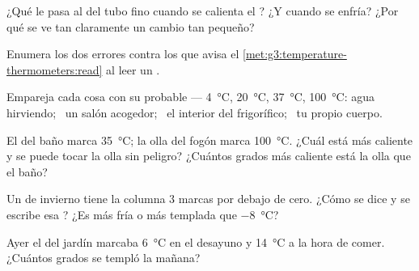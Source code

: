 \begin{exercise}[$\star$]\label{exo:g3:temperature-thermometers:3}
¿Qué le pasa al  del tubo fino cuando se calienta el
? ¿Y cuando se enfría? ¿Por qué se ve tan claramente un
cambio tan pequeño?
\end{exercise}

\begin{exercise}[$\star$]\label{exo:g3:temperature-thermometers:4}
Enumera los dos errores contra los que avisa el
\cref{met:g3:temperature-thermometers:read} al leer un .
\end{exercise}

\begin{exercise}[$\star$]\label{exo:g3:temperature-thermometers:5}
Empareja cada cosa con su  probable ---
\qty{4}{\celsius}, \qty{20}{\celsius}, \qty{37}{\celsius},
\qty{100}{\celsius}: agua hirviendo; \ un salón acogedor; \ el interior
del frigorífico; \ tu propio cuerpo.
\end{exercise}

\begin{exercise}[$\star$]\label{exo:g3:temperature-thermometers:6}
El  del baño marca \qty{35}{\celsius}; la olla del fogón
marca \qty{100}{\celsius}. ¿Cuál está más caliente y se puede tocar la
olla sin peligro? ¿Cuántos grados más caliente está la olla que el
baño?
\end{exercise}

\begin{exercise}[$\star$]\label{exo:g3:temperature-thermometers:7}
Un  de invierno tiene la columna $3$ marcas por debajo de
cero. ¿Cómo se dice y se escribe esa ? ¿Es más fría o más
templada que \qty{-8}{\celsius}?
\end{exercise}

\begin{exercise}[$\star$]\label{exo:g3:temperature-thermometers:8}
Ayer el  del jardín marcaba \qty{6}{\celsius} en el
desayuno y \qty{14}{\celsius} a la hora de comer. ¿Cuántos grados se
templó la mañana?
\end{exercise}

